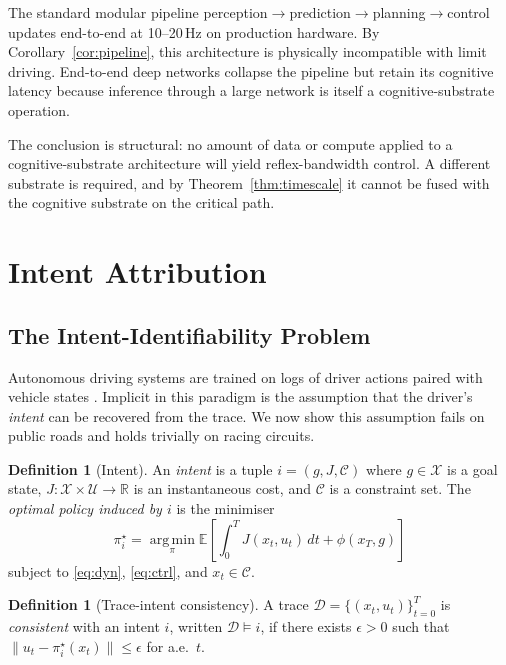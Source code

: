 \documentclass[11pt,twocolumn]{article}
\theoremstyle{definition}
\newtheorem{definition}[theorem]{Definition}
\theoremstyle{remark}
\newcommand{\R}{\mathbb{R}}
\newcommand{\E}{\mathbb{E}}
\newcommand{\argmin}{\operatorname*{arg\,min}}
\newcommand{\cC}{\mathcal{C}}
\newcommand{\cX}{\mathcal{X}}
\newcommand{\cU}{\mathcal{U}}
\begin{document}
The standard modular pipeline perception$\to$prediction$\to$planning$\to$control \cite{thrun2006stanley,urmson2008boss,levinson2011junior} updates end-to-end at 10--20\,Hz on production hardware. By Corollary~\ref{cor:pipeline}, this architecture is physically incompatible with limit driving. End-to-end deep networks \cite{bojarski2016endtoend,bansal2019chauffeurnet,codevilla2018endtoend} collapse the pipeline but retain its cognitive latency because inference through a large network is itself a cognitive-substrate operation.

The conclusion is structural: no amount of data or compute applied to a cognitive-substrate architecture will yield reflex-bandwidth control. A different substrate is required, and by Theorem~\ref{thm:timescale} it cannot be fused with the cognitive substrate on the critical path.

\section{Intent Attribution}
\label{sec:intent}

\subsection{The Intent-Identifiability Problem}

Autonomous driving systems are trained on logs of driver actions paired with vehicle states \cite{bansal2019chauffeurnet,codevilla2018endtoend}. Implicit in this paradigm is the assumption that the driver's \emph{intent} can be recovered from the trace. We now show this assumption fails on public roads and holds trivially on racing circuits.

\begin{definition}[Intent]\label{def:intent}
An \emph{intent} is a tuple $i = (g, J, \cC)$ where $g \in \cX$ is a goal state, $J: \cX \times \cU \to \R$ is an instantaneous cost, and $\cC$ is a constraint set. The \emph{optimal policy induced by $i$} is the minimiser
\begin{equation}
\pi_i^{\star} = \argmin_{\pi} \E\left[\int_0^{T} J(x_t, u_t)\,dt + \phi(x_T, g)\right]
\end{equation}
subject to \eqref{eq:dyn}, \eqref{eq:ctrl}, and $x_t \in \cC$.
\end{definition}

\begin{definition}[Trace-intent consistency]\label{def:consistency}
A trace $\mathcal{D} = \{(x_t, u_t)\}_{t=0}^{T}$ is \emph{consistent} with an intent $i$, written $\mathcal{D} \models i$, if there exists $\epsilon > 0$ such that $\|u_t - \pi_i^{\star}(x_t)\| \le \epsilon$ for a.e.\ $t$.
\end{definition}
\end{document}
